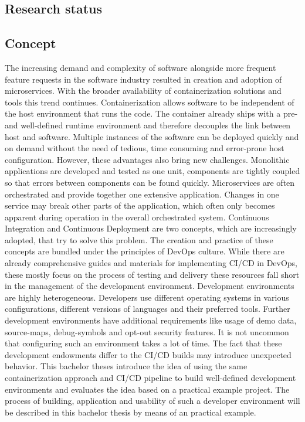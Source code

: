 \documentclass[12pt, a4paper]{article}
\begin{document}
\subsection{Research status}
\subsection{Concept}
The increasing demand and complexity of software alongside more frequent feature requests in the software industry resulted in creation and adoption of microservices. With the broader availability of containerization solutions and tools this trend continues. Containerization allows software to be independent of the host environment that runs the code. The container already ships with a pre- and well-defined runtime environment and therefore decouples the link between host and software. Multiple instances of the software can be deployed quickly and on demand without the need of tedious, time consuming and error-prone host configuration. However, these advantages also bring new challenges. Monolithic applications are developed and tested as one unit, components are tightly coupled so that errors between components can be found quickly. Microservices are often orchestrated and provide together one extensive application. Changes in one service may break other parts of the application, which often only becomes apparent during operation in the overall orchestrated system. Continuous Integration and Continuous Deployment are two concepts, which are increasingly adopted, that try to solve this problem. The creation and practice of these concepts are bundled under the principles of DevOps culture. While there are already comprehensive guides and materials for implementing CI/CD in DevOps, these mostly focus on the process of testing and delivery these resources fall short in the management of the development environment.\newline
Development environments are highly heterogeneous. Developers use different operating systems in various configurations, different versions of languages and their preferred tools. Further development environments have additional requirements like usage of demo data, source-maps, debug-symbols and opt-out security features. It is not uncommon that configuring such an environment takes a lot of time. The fact that these development endowments differ to the CI/CD builds may introduce unexpected behavior. This bachelor theses introduce the idea of using the same containerization approach and CI/CD pipeline to build well-defined development environments and evaluates the idea based on a practical example project.\newline
The process of building, application and usability of such a developer environment will be described in this bachelor thesis by means of an practical example.
\end{document}
